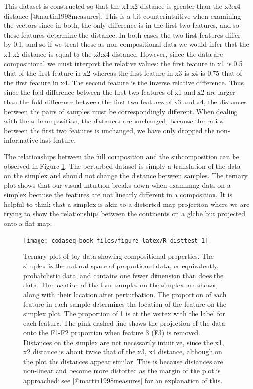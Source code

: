 \documentclass[
  onecolumn]{article}
\begin{document}
This dataset is constructed so that the x1:x2 distance is greater than the x3:x4 distance {[}@martin1998measures{]}. This is a bit counterintuitive when examining the vectors since in both, the only difference is in the first two features, and so these features determine the distance. In both cases the two first features differ by 0.1, and so if we treat these as non-compositional data we would infer that the x1:x2 distance is equal to the x3:x4 distance. However, since the data are compositional we must interpret the relative values: the first feature in x1 is 0.5 that of the first feature in x2 whereas the first feature in x3 is x4 is 0.75 that of the first feature in x4. The second feature is the inverse relative difference. Thus, since the fold difference between the first two features of x1 and x2 are larger than the fold difference between the first two features of x3 and x4, the distances between the pairs of samples must be correspondingly different. When dealing with the subcomposition, the distances are unchanged, because the ratios between the first two features is unchanged, we have only dropped the non-informative last feature.

The relationships between the full composition and the subcomposition can be observed in Figure \ref{fig:R-disttest}. The perturbed dataset is simply a translation of the data on the simplex and should not change the distance between samples. The ternary plot shows that our visual intuition breaks down when examining data on a simplex because the features are not linearly different in a composition. It is helpful to think that a simplex is akin to a distorted map projection where we are trying to show the relationships between the continents on a globe but projected onto a flat map.

\begin{figure}

{\centering \texttt{[image: codaseq-book\_files/figure-latex/R-disttest-1]} 

}

\caption{Ternary plot of toy data showing compositional properties. The simplex is the natural space of proportional data, or equivalently, probabilistic data, and contains one fewer dimension than does the data. The location of the four samples on the simplex are shown, along with their location after perturbation. The proportion of each feature in each sample determines the location of the feature on the simplex plot. The proportion of 1 is at the vertex with the label for each feature. The pink dashed line shows the projection of the data onto the F1-F2 proportion when feature 3 (F3) is removed. Distances on the simplex are not necessarily intuitive, since the x1, x2 distance is about twice that of the x3, x4 distance, although on the plot the distances appear similar. This is because distances are non-linear and become more distorted as the margin of the plot is approached: see [@martin1998measures] for an explanation of this.}\label{fig:R-disttest}
\end{figure}
\end{document}
